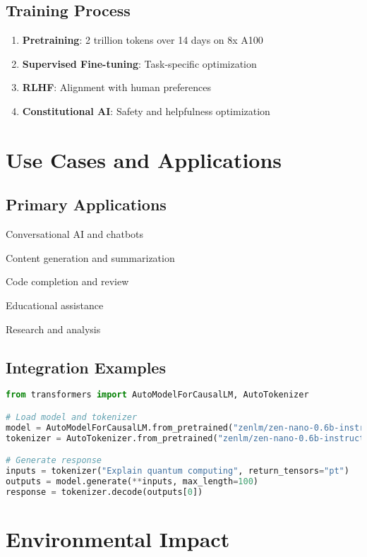 \documentclass[11pt,a4paper]{article}
\begin{document}
\subsection{Training Process}
\begin{enumerate}
    \item \textbf{Pretraining}: 2 trillion tokens over 14 days on 8x A100
    \item \textbf{Supervised Fine-tuning}: Task-specific optimization
    \item \textbf{RLHF}: Alignment with human preferences
    \item \textbf{Constitutional AI}: Safety and helpfulness optimization
\end{enumerate}

\section{Use Cases and Applications}

\subsection{Primary Applications}
\item Conversational AI and chatbots
\item Content generation and summarization
\item Code completion and review
\item Educational assistance
\item Research and analysis

\subsection{Integration Examples}

\begin{lstlisting}[language=Python, caption=Basic Usage Example]
from transformers import AutoModelForCausalLM, AutoTokenizer

# Load model and tokenizer
model = AutoModelForCausalLM.from_pretrained("zenlm/zen-nano-0.6b-instruct")
tokenizer = AutoTokenizer.from_pretrained("zenlm/zen-nano-0.6b-instruct")

# Generate response
inputs = tokenizer("Explain quantum computing", return_tensors="pt")
outputs = model.generate(**inputs, max_length=100)
response = tokenizer.decode(outputs[0])
\end{lstlisting}

\section{Environmental Impact}
\end{document}
